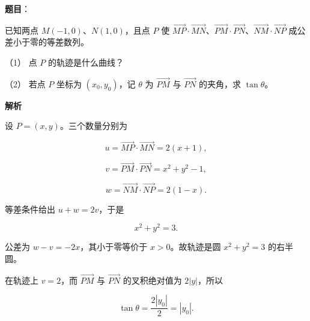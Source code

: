 \begin{answer}

\textbf{题目}：

已知两点 $M(-1,0)\text{、}N(1,0)$，且点 $P$ 使 $\overrightarrow{MP}\cdot\overrightarrow{MN}$、$\overrightarrow{PM}\cdot\overrightarrow{PN}$、$\overrightarrow{NM}\cdot\overrightarrow{NP}$ 成公差小于零的等差数列。

（1） 点 $P$ 的轨迹是什么曲线？

（2） 若点 $P$ 坐标为 $(x_0,y_0)$，记 $\theta$ 为 $\overrightarrow{PM}$ 与 $\overrightarrow{PN}$ 的夹角，求 $\tan\theta$。

\textbf{解析}


设 $P=(x,y)$。三个数量分别为

\nopagebreak[4]
\[
u=\overrightarrow{MP}\cdot\overrightarrow{MN}=2(x+1),
\]

\nopagebreak[4]
\[
v=\overrightarrow{PM}\cdot\overrightarrow{PN}=x^2+y^2-1,
\]

\nopagebreak[4]
\[
w=\overrightarrow{NM}\cdot\overrightarrow{NP}=2(1-x).
\]

等差条件给出 $u+w=2v$，于是

\nopagebreak[4]
\[
x^2+y^2=3.
\]

公差为 $w-v=-2x$，其小于零等价于 $x>0$。故轨迹是圆 $x^2+y^2=3$ 的右半圆。


在轨迹上 $v=2$，而 $\overrightarrow{PM}$ 与 $\overrightarrow{PN}$ 的叉积绝对值为 $2|y|$，所以

\nopagebreak[4]
\[
\tan\theta=\frac{2|y_0|}{2}=|y_0|.
\]



\end{answer}
